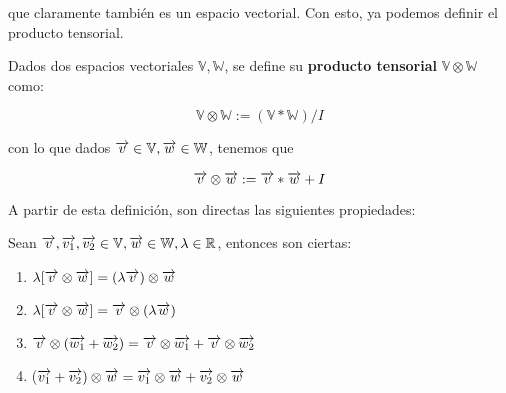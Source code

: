 que claramente también es un espacio vectorial. Con esto, ya podemos definir el producto tensorial.

\begin{definicion}
    Dados dos espacios vectoriales $\mathbb{V}, \mathbb{W}$, se define su \textbf{producto tensorial} $\mathbb{V} \otimes \mathbb{W}$ como:

    $$\mathbb{V} \otimes \mathbb{W} := (\mathbb{V} \ast \mathbb{W}) / I$$

    con lo que dados $\overrightarrow{v} \in \mathbb{V}, \overrightarrow{w} \in \mathbb{W}$, tenemos que

    \begin{equation}
        \overrightarrow{v} \otimes \overrightarrow{w} := \overrightarrow{v} \ast \overrightarrow{w} + I
    \end{equation}
\end{definicion}

A partir de esta definición, son directas las siguientes propiedades:

\begin{proposicion} \label{prop:tensores_propiedades}
    Sean $\overrightarrow{v}, \overrightarrow{v_1}, \overrightarrow{v_2} \in \mathbb{V}, \overrightarrow{w} \in \mathbb{W}, \lambda \in \mathbb{R}$, entonces son ciertas:
    \begin{enumerate}
        \item $\lambda [\overrightarrow{v} \otimes \overrightarrow{w}] = (\lambda \overrightarrow{v}) \otimes \overrightarrow{w}$
        \item $\lambda [\overrightarrow{v} \otimes \overrightarrow{w}] = \overrightarrow{v} \otimes (\lambda \overrightarrow{w})$
        \item $\overrightarrow{v} \otimes (\overrightarrow{w_1} + \overrightarrow{w_2}) = \overrightarrow{v} \otimes \overrightarrow{w_1} + \overrightarrow{v} \otimes \overrightarrow{w_2}$
        \item ($\overrightarrow{v_1} + \overrightarrow{v_2}) \otimes \overrightarrow{w} = \overrightarrow{v_1} \otimes \overrightarrow{w} + \overrightarrow{v_2} \otimes \overrightarrow{w}$
    \end{enumerate}
\end{proposicion}

